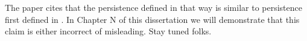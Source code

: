 


The paper \cite{ct-branch-decomp} cites that the persistence defined in that way is similar to persistence first defined in \cite{persistence-original}. In Chapter N of this dissertation we will demonstrate that this claim is either incorrect of misleading. Stay tuned folks.










